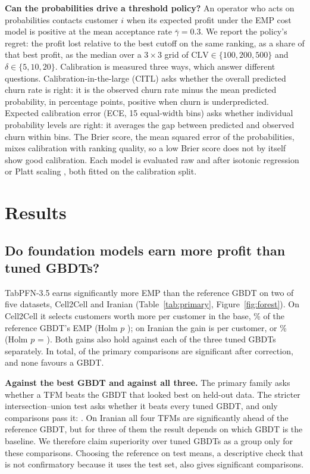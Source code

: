\documentclass[11pt]{article}
\newcommand{\tfm}{TFM\xspace}
\newcommand{\tfms}{TFMs\xspace}
\begin{document}
\textbf{Can the probabilities drive a threshold policy?} An operator who acts on probabilities contacts customer $i$
when its expected profit under the EMP cost model is positive at the mean acceptance rate $\bar\gamma=0.3$. We report
the policy's regret: the profit lost relative to the best cutoff on the same ranking, as a share of that best profit,
as the median over a $3\times3$ grid of $\mathrm{CLV}\in\{100,200,500\}$ and $\delta\in\{5,10,20\}$. Calibration is
measured three ways, which answer different questions. Calibration-in-the-large (CITL) asks whether the overall
predicted churn rate is right: it is the observed churn rate minus the mean predicted probability, in percentage
points, positive when churn is underpredicted. Expected calibration error (ECE, 15 equal-width bins) asks whether
individual probability levels are right: it averages the gap between predicted and observed churn within bins. The
Brier score, the mean squared error of the probabilities, mixes calibration with ranking quality, so a low Brier score
does not by itself show good calibration.
Each model is evaluated raw and after isotonic regression \cite{zadrozny2002transforming} or Platt scaling
\cite{platt1999probabilistic}, both fitted on the calibration split.

\section{Results}

\subsection{Do foundation models earn more profit than tuned GBDTs?}\label{sec:rq1}

TabPFN-3.5 earns significantly more EMP than the reference GBDT on two of five datasets, Cell2Cell and Iranian
(Table~\ref{tab:primary}, Figure~\ref{fig:forest}). On Cell2Cell it selects customers worth \empAbsPFNThreeCellTwoCellAbs{}
more per customer in the base, \empPFNThreeCellTwoCellAbs\% of the reference GBDT's EMP (Holm $p$
\holmPFNThreeCellTwoCell); on Iranian the gain is \empAbsPFNThreeIranianAbs{} per customer, or \empPFNThreeIranianAbs\%
(Holm $p$ = \holmPFNThreeIranian). Both gains also hold against each of the three tuned GBDTs separately. In total,
\nHolmSig{} of the \nPrimary{} primary comparisons are significant after correction, and none favours a GBDT.

\textbf{Against the best GBDT and against all three.} The primary family asks whether a \tfm beats the GBDT that looked
best on held-out data. The stricter intersection--union test asks whether it beats every tuned GBDT, and only \nIUSig{}
comparisons pass it: \iuSigCases. On Iranian all four \tfms are significantly ahead of the reference GBDT, but for three
of them the result depends on which GBDT is the baseline. We therefore claim superiority over tuned GBDTs as a group
only for these \nIUSig{} comparisons. Choosing the reference on test means, a descriptive check that is not confirmatory
because it uses the test set, also gives \nHolmSigTest{} significant comparisons.
\end{document}
